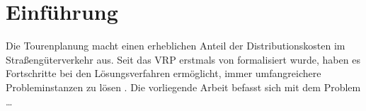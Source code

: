 \documentclass[11pt,a4paper]{article}
\begin{document}
%

\section{Einführung}
\label{sec:einfuehrung}
Die Tourenplanung macht einen erheblichen Anteil der Distributionskosten im Straßengüterverkehr aus. Seit das \ac{VRP} erstmals von \textcite{dantzig1959truck} formalisiert wurde, haben es Fortschritte bei den Lösungsverfahren ermöglicht, immer umfangreichere Probleminstanzen zu lösen \parencite{desaulniers2005column}. Die vorliegende Arbeit befasst sich mit dem Problem \ldots
\end{document}

